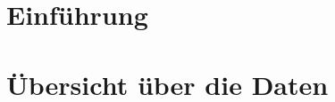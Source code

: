 \documentclass[
	a4paper, %
	12pt, %
	twoside, %
	BCOR=5mm, %
	fleqn, %
	bibliography=totoc, %
]{report}
\begin{document}
	

	\begin{abstract}
		\lipsum[1]
	\end{abstract}

	\tableofcontents

	\chapter{Einführung}
	
	
	\chapter{Übersicht über die Daten}
	
	
	

	\newpage
	
\end{document}
